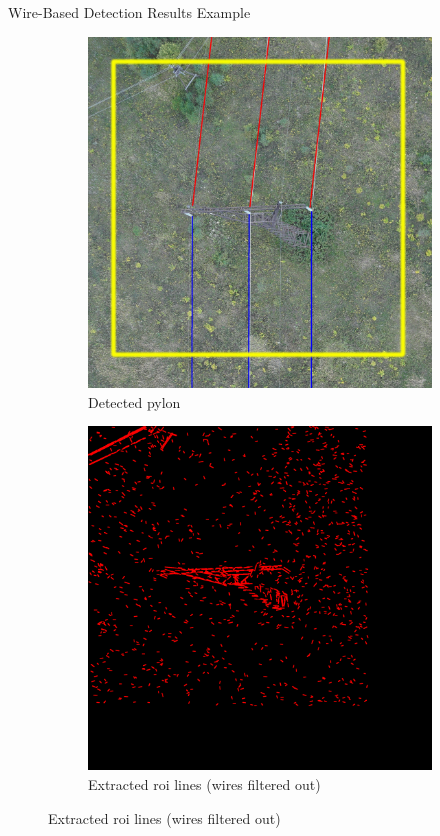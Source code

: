\documentclass{beamer}
\begin{document}
\begin{frame}[t, fragile]{Wire-Based Detection Results Example}
\begin{figure}
\centering
\begin{subfigure}{.5\textwidth}
\centering
\includegraphics[scale=0.07]{intersection1}
\caption{Detected pylon}
\end{subfigure}%
\begin{subfigure}{.5\textwidth}
\centering
\includegraphics[scale=0.072]{pylon1}
\caption{Extracted roi lines (wires filtered out)}
\end{subfigure}
\end{figure}
\end{frame}
\end{document}
